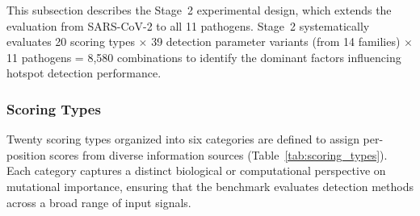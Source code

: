 This subsection describes the Stage~2 experimental design, which extends the evaluation from SARS-CoV-2 to all 11 pathogens.
Stage~2 systematically evaluates 20 scoring types $\times$ 39 detection parameter variants (from 14 families) $\times$ 11 pathogens = 8,580 combinations to identify the dominant factors influencing hotspot detection performance.

\subsubsection{Scoring Types}
\label{subsec:9pathogen_scoring}
\label{sec:scoring_detection}

Twenty scoring types organized into six categories are defined to assign per-position scores from diverse information sources (Table~\ref{tab:scoring_types}).
Each category captures a distinct biological or computational perspective on mutational importance, ensuring that the benchmark evaluates detection methods across a broad range of input signals.

